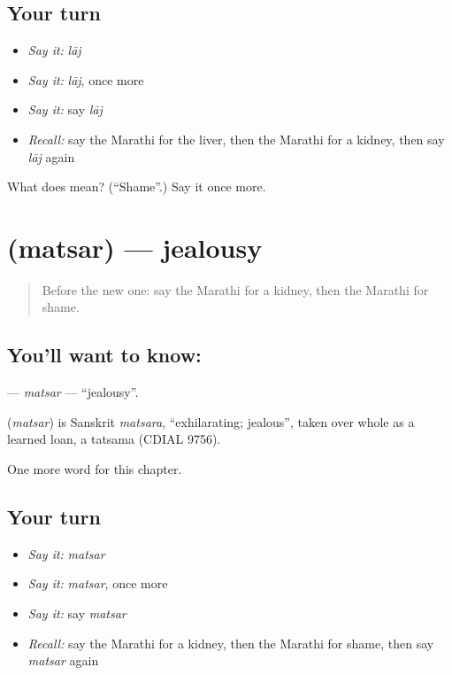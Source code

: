 \subsection*{Your turn}
\begin{itemize}
\raggedright
  \item \emph{Say it:} \emph{lāj}
  \item \emph{Say it:} \emph{lāj}, once more
  \item \emph{Say it:} say \emph{lāj}
  \item \emph{Recall:} say the Marathi for the liver, then the Marathi for a kidney, then say \emph{lāj} again
\end{itemize}

\begin{tcolorbox}[breakable,colback=teal!4,colframe=teal!35!black,title={Before you move on}]
What does  mean? (\textquotedblleft{}Shame\textquotedblright{}.) Say it once more.
\end{tcolorbox}
\section[\texorpdfstring{\mr{मत्सर} (matsar)}{मत्सर (matsar)}]{ (matsar) — jealousy}

\label{lesson:MR-C170-matsar}



\begin{quote}
Before the new one: say the Marathi for a kidney, then the Marathi for shame.
\end{quote}

\subsection*{You'll want to know: }
\textbf{} — \emph{matsar} — \textquotedblleft{}jealousy\textquotedblright{}.

\begin{cousinweb}
\textbf{} (\emph{matsar}) is Sanskrit \emph{matsara}, \textquotedblleft{}exhilarating; jealous\textquotedblright{}, taken over whole as a learned loan, a tatsama (CDIAL 9756).
\end{cousinweb}

\begin{grammarlens}[title={What you've built}]
One more word for this chapter.
\end{grammarlens}

\subsection*{Your turn}
\begin{itemize}
\raggedright
  \item \emph{Say it:} \emph{matsar}
  \item \emph{Say it:} \emph{matsar}, once more
  \item \emph{Say it:} say \emph{matsar}
  \item \emph{Recall:} say the Marathi for a kidney, then the Marathi for shame, then say \emph{matsar} again
\end{itemize}

